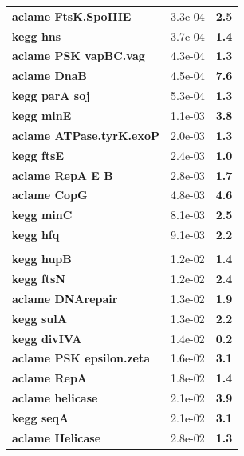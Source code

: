 \begin{landscape}
\begin{table}
{\begin{minipage}[t]{0.3\textwidth}
\begin{tabular}{>{\bfseries}p{\textwidth}cc}
\rowcolor{posit}aclame FtsK.SpoIIIE&3.3e-04&\textbf{\colorbox{colorpower}{2.5}}\\
\rowcolor{posit}kegg hns&3.7e-04&\textbf{\colorbox{colorpower}{1.4}}\\
\rowcolor{posit}aclame PSK vapBC.vag&4.3e-04&\textbf{\colorbox{colorpower}{1.3}}\\
\rowcolor{posit}aclame DnaB&4.5e-04&\textbf{\colorbox{colorpowerxx}{7.6}}\\
\rowcolor{posit}kegg parA soj&5.3e-04&\textbf{\colorbox{colorpower}{1.3}}\\
\rowcolor{posit}kegg minE&1.1e-03&\textbf{\colorbox{colorpowerx}{3.8}}\\
\rowcolor{posit}aclame ATPase.tyrK.exoP&2.0e-03&\textbf{\colorbox{colorpower}{1.3}}\\
\rowcolor{posit}kegg ftsE&2.4e-03&\textbf{\colorbox{colorpower}{1.0}}\\
\rowcolor{posit}aclame RepA E B&2.8e-03&\textbf{\colorbox{colorpower}{1.7}}\\
\rowcolor{posit}aclame CopG&4.8e-03&\textbf{\colorbox{colorpowerx}{4.6}}\\
\rowcolor{posit}kegg minC&8.1e-03&\textbf{\colorbox{colorpower}{2.5}}\\
\rowcolor{posit}kegg hfq&9.1e-03&\textbf{\colorbox{colorpower}{2.2}}\\
\\
\rowcolor{posit2}kegg hupB&1.2e-02&\textbf{\colorbox{colorpower}{1.4}}\\
\rowcolor{posit2}kegg ftsN&1.2e-02&\textbf{\colorbox{colorpower}{2.4}}\\
\rowcolor{posit2}aclame DNArepair&1.3e-02&\textbf{\colorbox{colorpower}{1.9}}\\
\rowcolor{posit2}kegg sulA&1.3e-02&\textbf{\colorbox{colorpower}{2.2}}\\
\rowcolor{posit2}kegg divIVA&1.4e-02&\textbf{\colorbox{colorpowernegx}{0.2}}\\
\rowcolor{posit2}aclame PSK epsilon.zeta&1.6e-02&\textbf{\colorbox{colorpowerx}{3.1}}\\
\rowcolor{posit2}aclame RepA&1.8e-02&\textbf{\colorbox{colorpower}{1.4}}\\
\rowcolor{posit2}aclame helicase&2.1e-02&\textbf{\colorbox{colorpowerx}{3.9}}\\
\rowcolor{posit2}kegg seqA&2.1e-02&\textbf{\colorbox{colorpowerx}{3.1}}\\
\rowcolor{posit2}aclame Helicase&2.8e-02&\textbf{\colorbox{colorpower}{1.3}}\\

\end{tabular}
\end{minipage}}
\end{table}
\end{landscape}
